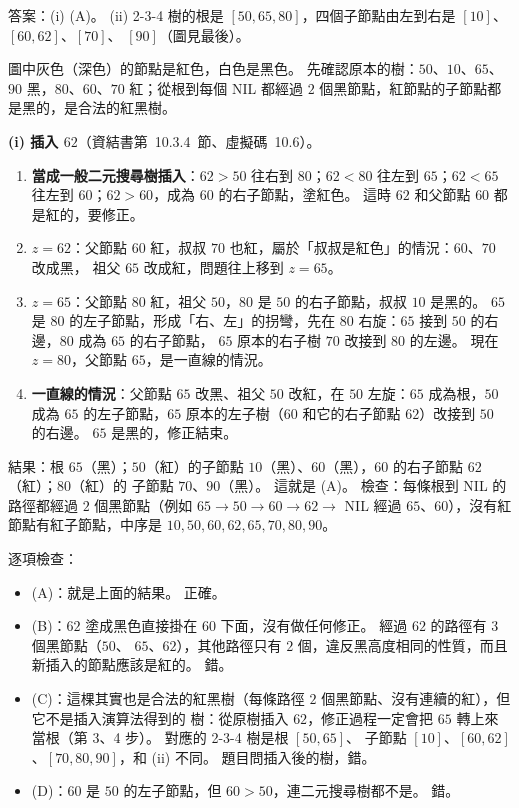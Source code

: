 \begin{pastsoln}
答案：(i) (A)。 (ii) 2-3-4 樹的根是 $[50, 65, 80]$，四個子節點由左到右是 $[10]$、$[60, 62]$、$[70]$、
$[90]$（圖見最後）。

圖中灰色（深色）的節點是紅色，白色是黑色。 先確認原本的樹：$50$、$10$、$65$、$90$ 黑，$80$、$60$、$70$
紅；從根到每個 NIL 都經過 $2$ 個黑節點，紅節點的子節點都是黑的，是合法的紅黑樹。

\textbf{(i) 插入 $62$}（資結書第~10.3.4~節、虛擬碼~10.6）。
\begin{enumerate}
\item \textbf{當成一般二元搜尋樹插入}：$62 > 50$ 往右到 $80$；$62 < 80$ 往左到 $65$；$62 < 65$ 往左到
$60$；$62 > 60$，成為 $60$ 的右子節點，塗紅色。 這時 $62$ 和父節點 $60$ 都是紅的，要修正。
\item \textbf{$z = 62$}：父節點 $60$ 紅，叔叔 $70$ 也紅，屬於「叔叔是紅色」的情況：$60$、$70$ 改成黑，
祖父 $65$ 改成紅，問題往上移到 $z = 65$。
\item \textbf{$z = 65$}：父節點 $80$ 紅，祖父 $50$，$80$ 是 $50$ 的右子節點，叔叔 $10$ 是黑的。 $65$ 是
$80$ 的左子節點，形成「右、左」的拐彎，先在 $80$ 右旋：$65$ 接到 $50$ 的右邊，$80$ 成為 $65$ 的右子節點，
$65$ 原本的右子樹 $70$ 改接到 $80$ 的左邊。 現在 $z = 80$，父節點 $65$，是一直線的情況。
\item \textbf{一直線的情況}：父節點 $65$ 改黑、祖父 $50$ 改紅，在 $50$ 左旋：$65$ 成為根，$50$ 成為
$65$ 的左子節點，$65$ 原本的左子樹（$60$ 和它的右子節點 $62$）改接到 $50$ 的右邊。 $65$ 是黑的，修正結束。
\end{enumerate}
結果：根 $65$（黑）；$50$（紅）的子節點 $10$（黑）、$60$（黑），$60$ 的右子節點 $62$（紅）；$80$（紅）的
子節點 $70$、$90$（黑）。 這就是 (A)。 檢查：每條根到 NIL 的路徑都經過 $2$ 個黑節點（例如
$65 \to 50 \to 60 \to 62 \to$ NIL 經過 $65$、$60$），沒有紅節點有紅子節點，中序是
$10, 50, 60, 62, 65, 70, 80, 90$。

逐項檢查：
\begin{itemize}
\item (A)：就是上面的結果。 正確。
\item (B)：$62$ 塗成黑色直接掛在 $60$ 下面，沒有做任何修正。 經過 $62$ 的路徑有 $3$ 個黑節點（$50$、
$65$、$62$），其他路徑只有 $2$ 個，違反黑高度相同的性質，而且新插入的節點應該是紅的。 錯。
\item (C)：這棵其實也是合法的紅黑樹（每條路徑 $2$ 個黑節點、沒有連續的紅），但它不是插入演算法得到的
樹：從原樹插入 $62$，修正過程一定會把 $65$ 轉上來當根（第 3、4 步）。 對應的 2-3-4 樹是根 $[50, 65]$、
子節點 $[10]$、$[60, 62]$、$[70, 80, 90]$，和 (ii) 不同。 題目問插入後的樹，錯。
\item (D)：$60$ 是 $50$ 的左子節點，但 $60 > 50$，連二元搜尋樹都不是。 錯。
\end{itemize}


\end{pastsoln}
